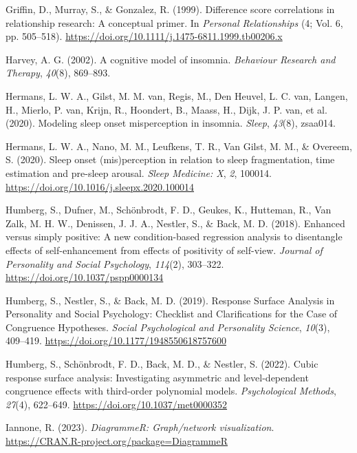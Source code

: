 \documentclass[
]{article}
\newlength{\cslhangindent}
\newenvironment{CSLReferences}[2] %
 {\begin{list}{}{%
  \setlength{\itemindent}{0pt}
  \setlength{\leftmargin}{0pt}
  \setlength{\parsep}{0pt}
  \ifodd #1
   \setlength{\leftmargin}{\cslhangindent}
   \setlength{\itemindent}{-1\cslhangindent}
  \fi
  \setlength{\itemsep}{#2\baselineskip}}}
 {\end{list}}
\begin{document}
\begin{CSLReferences}{1}{0}
Griffin, D., Murray, S., \& Gonzalez, R. (1999). {Difference score correlations in relationship research: A conceptual primer}. In \emph{Personal Relationships} (4; Vol. 6, pp. 505--518). \url{https://doi.org/10.1111/j.1475-6811.1999.tb00206.x}

Harvey, A. G. (2002). A cognitive model of insomnia. \emph{Behaviour Research and Therapy}, \emph{40}(8), 869--893.

Hermans, L. W. A., Gilst, M. M. van, Regis, M., Den Heuvel, L. C. van, Langen, H., Mierlo, P. van, Krijn, R., Hoondert, B., Maass, H., Dijk, J. P. van, et al. (2020). Modeling sleep onset misperception in insomnia. \emph{Sleep}, \emph{43}(8), zsaa014.

Hermans, L. W. A., Nano, M. M., Leufkens, T. R., Van Gilst, M. M., \& Overeem, S. (2020). Sleep onset (mis)perception in relation to sleep fragmentation, time estimation and pre-sleep arousal. \emph{Sleep Medicine: X}, \emph{2}, 100014. \url{https://doi.org/10.1016/j.sleepx.2020.100014}

Humberg, S., Dufner, M., Schönbrodt, F. D., Geukes, K., Hutteman, R., Van Zalk, M. H. W., Denissen, J. J. A., Nestler, S., \& Back, M. D. (2018). Enhanced versus simply positive: {A} new condition-based regression analysis to disentangle effects of self-enhancement from effects of positivity of self-view. \emph{Journal of Personality and Social Psychology}, \emph{114}(2), 303--322. \url{https://doi.org/10.1037/pspp0000134}

Humberg, S., Nestler, S., \& Back, M. D. (2019). Response {Surface} {Analysis} in {Personality} and {Social} {Psychology}: {Checklist} and {Clarifications} for the {Case} of {Congruence} {Hypotheses}. \emph{Social Psychological and Personality Science}, \emph{10}(3), 409--419. \url{https://doi.org/10.1177/1948550618757600}

Humberg, S., Schönbrodt, F. D., Back, M. D., \& Nestler, S. (2022). Cubic response surface analysis: {Investigating} asymmetric and level-dependent congruence effects with third-order polynomial models. \emph{Psychological Methods}, \emph{27}(4), 622--649. \url{https://doi.org/10.1037/met0000352}

Iannone, R. (2023). \emph{DiagrammeR: Graph/network visualization}. \url{https://CRAN.R-project.org/package=DiagrammeR}


\end{CSLReferences}
\end{document}
